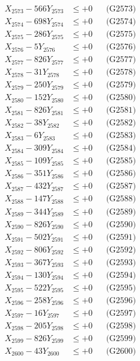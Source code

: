\documentclass[a4paper,10pt]{article}
\begin{document}
{\begin{align}
X_{2573} - 566Y_{2573} &\leq +0 && \text{(G2573)} \\
X_{2574} - 698Y_{2574} &\leq +0 && \text{(G2574)} \\
X_{2575} - 286Y_{2575} &\leq +0 && \text{(G2575)} \\
X_{2576} - 5Y_{2576} &\leq +0 && \text{(G2576)} \\
X_{2577} - 826Y_{2577} &\leq +0 && \text{(G2577)} \\
X_{2578} - 31Y_{2578} &\leq +0 && \text{(G2578)} \\
X_{2579} - 250Y_{2579} &\leq +0 && \text{(G2579)} \\
X_{2580} - 152Y_{2580} &\leq +0 && \text{(G2580)} \\
\allowbreak
X_{2581} - 826Y_{2581} &\leq +0 && \text{(G2581)} \\
X_{2582} - 38Y_{2582} &\leq +0 && \text{(G2582)} \\
X_{2583} - 6Y_{2583} &\leq +0 && \text{(G2583)} \\
X_{2584} - 309Y_{2584} &\leq +0 && \text{(G2584)} \\
X_{2585} - 109Y_{2585} &\leq +0 && \text{(G2585)} \\
X_{2586} - 351Y_{2586} &\leq +0 && \text{(G2586)} \\
X_{2587} - 432Y_{2587} &\leq +0 && \text{(G2587)} \\
X_{2588} - 147Y_{2588} &\leq +0 && \text{(G2588)} \\
X_{2589} - 344Y_{2589} &\leq +0 && \text{(G2589)} \\
X_{2590} - 826Y_{2590} &\leq +0 && \text{(G2590)} \\
\allowbreak
X_{2591} - 502Y_{2591} &\leq +0 && \text{(G2591)} \\
X_{2592} - 806Y_{2592} &\leq +0 && \text{(G2592)} \\
X_{2593} - 367Y_{2593} &\leq +0 && \text{(G2593)} \\
X_{2594} - 130Y_{2594} &\leq +0 && \text{(G2594)} \\
X_{2595} - 522Y_{2595} &\leq +0 && \text{(G2595)} \\
X_{2596} - 258Y_{2596} &\leq +0 && \text{(G2596)} \\
X_{2597} - 16Y_{2597} &\leq +0 && \text{(G2597)} \\
X_{2598} - 205Y_{2598} &\leq +0 && \text{(G2598)} \\
X_{2599} - 826Y_{2599} &\leq +0 && \text{(G2599)} \\
X_{2600} - 43Y_{2600} &\leq +0 && \text{(G2600)} \\

\end{align}}
\end{document}
